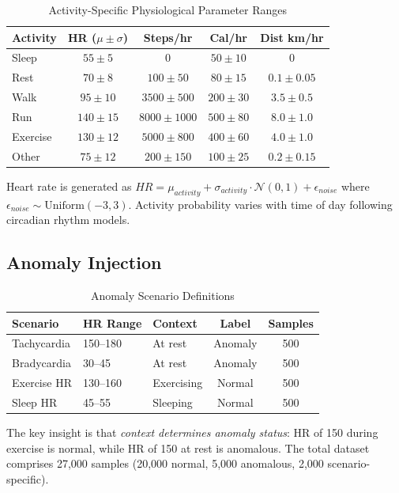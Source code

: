 \documentclass[conference]{IEEEtran}
\begin{document}
\begin{table}[H]
\centering
\caption{Activity-Specific Physiological Parameter Ranges}
\label{tab:activity_params}
\begin{tabular}{lcccc}
\toprule
\textbf{Activity} & \textbf{HR ($\mu \pm \sigma$)} & \textbf{Steps/hr} & \textbf{Cal/hr} & \textbf{Dist km/hr} \\
\midrule
Sleep & $55 \pm 5$ & 0 & $50 \pm 10$ & 0 \\
Rest & $70 \pm 8$ & $100 \pm 50$ & $80 \pm 15$ & $0.1 \pm 0.05$ \\
Walk & $95 \pm 10$ & $3500 \pm 500$ & $200 \pm 30$ & $3.5 \pm 0.5$ \\
Run & $140 \pm 15$ & $8000 \pm 1000$ & $500 \pm 80$ & $8.0 \pm 1.0$ \\
Exercise & $130 \pm 12$ & $5000 \pm 800$ & $400 \pm 60$ & $4.0 \pm 1.0$ \\
Other & $75 \pm 12$ & $200 \pm 150$ & $100 \pm 25$ & $0.2 \pm 0.15$ \\
\bottomrule
\end{tabular}
\end{table}

Heart rate is generated as $HR = \mu_{activity} + \sigma_{activity} \cdot \mathcal{N}(0, 1) + \epsilon_{noise}$ where $\epsilon_{noise} \sim \text{Uniform}(-3, 3)$. Activity probability varies with time of day following circadian rhythm models.

\subsection{Anomaly Injection}

\begin{table}[H]
\centering
\caption{Anomaly Scenario Definitions}
\label{tab:anomaly_scenarios}
\begin{tabular}{lllcc}
\toprule
\textbf{Scenario} & \textbf{HR Range} & \textbf{Context} & \textbf{Label} & \textbf{Samples} \\
\midrule
Tachycardia & 150--180 & At rest & Anomaly & 500 \\
Bradycardia & 30--45 & At rest & Anomaly & 500 \\
Exercise HR & 130--160 & Exercising & Normal & 500 \\
Sleep HR & 45--55 & Sleeping & Normal & 500 \\
\bottomrule
\end{tabular}
\end{table}

The key insight is that \textit{context determines anomaly status}: HR of 150 during exercise is normal, while HR of 150 at rest is anomalous. The total dataset comprises 27,000 samples (20,000 normal, 5,000 anomalous, 2,000 scenario-specific).
\end{document}
